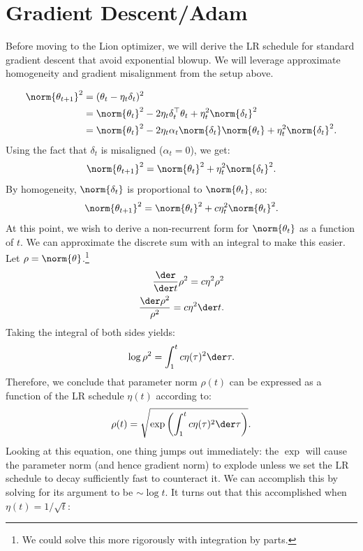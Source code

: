 \documentclass{article}
\begin{document}
\section{Gradient Descent/Adam}

Before moving to the Lion optimizer, we will derive the LR schedule for standard gradient descent that avoid exponential blowup. We will leverage approximate homogeneity and gradient misalignment from the setup above.

\begin{align*}
    \norm{\theta_{t+1}}^2
    &= (\theta_t - \eta_t \delta_t)^2 \\
    &= \norm{\theta_t}^2 - 2 \eta_t \delta_t^\top \theta_t + \eta_t^2 \norm{\delta_t}^2 \\
    &= \norm{\theta_t}^2 - 2 \eta_t \alpha_t \norm{\delta_t} \norm{\theta_t} + \eta_t^2 \norm{\delta_t}^2 .
\end{align*}
Using the fact that $\delta_t$ is misaligned ($\alpha_t = 0$), we get:
\begin{equation*} \label{eq:norm2}
    \norm{\theta_{t+1}}^2 = \norm{\theta_t}^2 + \eta_t^2 \norm{\delta_t}^2 .
\end{equation*}
By homogeneity, $\norm{\delta_t}$ is proportional to $\norm{\theta_t}$, so:
\begin{equation*}
    \norm{\theta_{t+1}}^2 = \norm{\theta_t}^2 + c\eta_t^2 \norm{\theta_t}^2 .
\end{equation*}
At this point, we wish to derive a non-recurrent form for $\norm{\theta_{t}}$ as a function of $t$.
We can approximate the discrete sum with an integral to make this easier. Let $\rho = \norm{\theta}$.\footnote{We could solve this more rigorously with integration by parts.}
\begin{align*}
    \frac{\der}{\der t} \rho^2 = c\eta^2 \rho^2 \\
    \frac{\der \rho^2}{\rho^2} = c \eta^2 \der t .
\end{align*}
Taking the integral of both sides yields:
\begin{equation*}
    \log \rho^2 = \int_1^t c \eta(\tau)^2 \der \tau .
\end{equation*}
Therefore, we conclude that parameter norm $\rho(t)$ can be expressed as a function of the LR schedule $\eta(t)$ according to:
\begin{equation*}
    \rho(t) = \sqrt{\exp \left( \int_1^t c \eta(\tau)^2 \der \tau \right)} .
\end{equation*}
Looking at this equation, one thing jumps out immediately: the $\exp$ will cause the parameter norm (and hence gradient norm) to explode unless we set the LR schedule to decay sufficiently fast to counteract it. We can accomplish this by solving for its argument to be $\sim \log t$. It turns out that this accomplished when $\eta(t) = 1/\sqrt{t}$:
\end{document}
